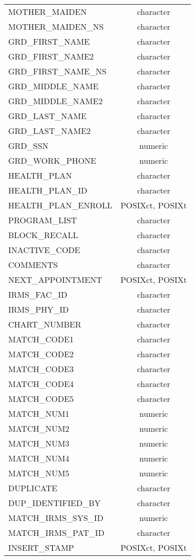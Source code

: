 \documentclass[
  letterpaper,
  DIV=11,
  numbers=noendperiod]{scrreprt}
\begin{document}
\begin{longtable}{lc}
MOTHER\_MAIDEN & character \\ 
MOTHER\_MAIDEN\_NS & character \\ 
GRD\_FIRST\_NAME & character \\ 
GRD\_FIRST\_NAME2 & character \\ 
GRD\_FIRST\_NAME\_NS & character \\ 
GRD\_MIDDLE\_NAME & character \\ 
GRD\_MIDDLE\_NAME2 & character \\ 
GRD\_LAST\_NAME & character \\ 
GRD\_LAST\_NAME2 & character \\ 
GRD\_SSN & numeric \\ 
GRD\_WORK\_PHONE & numeric \\ 
HEALTH\_PLAN & character \\ 
HEALTH\_PLAN\_ID & character \\ 
HEALTH\_PLAN\_ENROLL & POSIXct, POSIXt \\ 
PROGRAM\_LIST & character \\ 
BLOCK\_RECALL & character \\ 
INACTIVE\_CODE & character \\ 
COMMENTS & character \\ 
NEXT\_APPOINTMENT & POSIXct, POSIXt \\ 
IRMS\_FAC\_ID & character \\ 
IRMS\_PHY\_ID & character \\ 
CHART\_NUMBER & character \\ 
MATCH\_CODE1 & character \\ 
MATCH\_CODE2 & character \\ 
MATCH\_CODE3 & character \\ 
MATCH\_CODE4 & character \\ 
MATCH\_CODE5 & character \\ 
MATCH\_NUM1 & numeric \\ 
MATCH\_NUM2 & numeric \\ 
MATCH\_NUM3 & numeric \\ 
MATCH\_NUM4 & numeric \\ 
MATCH\_NUM5 & numeric \\ 
DUPLICATE & character \\ 
DUP\_IDENTIFIED\_BY & character \\ 
MATCH\_IRMS\_SYS\_ID & numeric \\ 
MATCH\_IRMS\_PAT\_ID & character \\ 
INSERT\_STAMP & POSIXct, POSIXt \\ 

\end{longtable}
\end{document}
